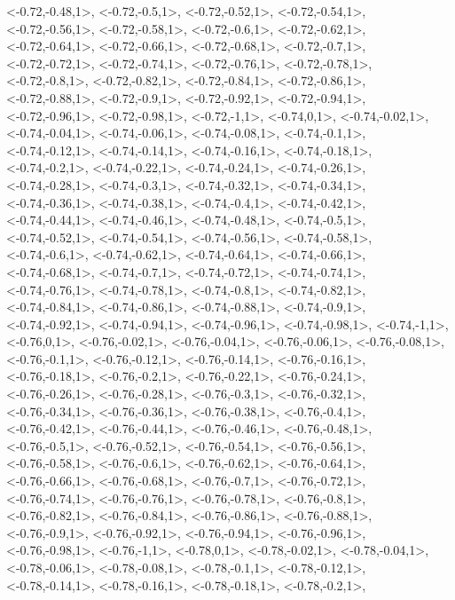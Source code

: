 \documentclass[a4paper,10pt]{article}
\begin{document}
\begin{eulernotebook}
\begin{euleroutput}
  <-0.72,-0.48,1>,
  <-0.72,-0.5,1>,
  <-0.72,-0.52,1>,
  <-0.72,-0.54,1>,
  <-0.72,-0.56,1>,
  <-0.72,-0.58,1>,
  <-0.72,-0.6,1>,
  <-0.72,-0.62,1>,
  <-0.72,-0.64,1>,
  <-0.72,-0.66,1>,
  <-0.72,-0.68,1>,
  <-0.72,-0.7,1>,
  <-0.72,-0.72,1>,
  <-0.72,-0.74,1>,
  <-0.72,-0.76,1>,
  <-0.72,-0.78,1>,
  <-0.72,-0.8,1>,
  <-0.72,-0.82,1>,
  <-0.72,-0.84,1>,
  <-0.72,-0.86,1>,
  <-0.72,-0.88,1>,
  <-0.72,-0.9,1>,
  <-0.72,-0.92,1>,
  <-0.72,-0.94,1>,
  <-0.72,-0.96,1>,
  <-0.72,-0.98,1>,
  <-0.72,-1,1>,
  <-0.74,0,1>,
  <-0.74,-0.02,1>,
  <-0.74,-0.04,1>,
  <-0.74,-0.06,1>,
  <-0.74,-0.08,1>,
  <-0.74,-0.1,1>,
  <-0.74,-0.12,1>,
  <-0.74,-0.14,1>,
  <-0.74,-0.16,1>,
  <-0.74,-0.18,1>,
  <-0.74,-0.2,1>,
  <-0.74,-0.22,1>,
  <-0.74,-0.24,1>,
  <-0.74,-0.26,1>,
  <-0.74,-0.28,1>,
  <-0.74,-0.3,1>,
  <-0.74,-0.32,1>,
  <-0.74,-0.34,1>,
  <-0.74,-0.36,1>,
  <-0.74,-0.38,1>,
  <-0.74,-0.4,1>,
  <-0.74,-0.42,1>,
  <-0.74,-0.44,1>,
  <-0.74,-0.46,1>,
  <-0.74,-0.48,1>,
  <-0.74,-0.5,1>,
  <-0.74,-0.52,1>,
  <-0.74,-0.54,1>,
  <-0.74,-0.56,1>,
  <-0.74,-0.58,1>,
  <-0.74,-0.6,1>,
  <-0.74,-0.62,1>,
  <-0.74,-0.64,1>,
  <-0.74,-0.66,1>,
  <-0.74,-0.68,1>,
  <-0.74,-0.7,1>,
  <-0.74,-0.72,1>,
  <-0.74,-0.74,1>,
  <-0.74,-0.76,1>,
  <-0.74,-0.78,1>,
  <-0.74,-0.8,1>,
  <-0.74,-0.82,1>,
  <-0.74,-0.84,1>,
  <-0.74,-0.86,1>,
  <-0.74,-0.88,1>,
  <-0.74,-0.9,1>,
  <-0.74,-0.92,1>,
  <-0.74,-0.94,1>,
  <-0.74,-0.96,1>,
  <-0.74,-0.98,1>,
  <-0.74,-1,1>,
  <-0.76,0,1>,
  <-0.76,-0.02,1>,
  <-0.76,-0.04,1>,
  <-0.76,-0.06,1>,
  <-0.76,-0.08,1>,
  <-0.76,-0.1,1>,
  <-0.76,-0.12,1>,
  <-0.76,-0.14,1>,
  <-0.76,-0.16,1>,
  <-0.76,-0.18,1>,
  <-0.76,-0.2,1>,
  <-0.76,-0.22,1>,
  <-0.76,-0.24,1>,
  <-0.76,-0.26,1>,
  <-0.76,-0.28,1>,
  <-0.76,-0.3,1>,
  <-0.76,-0.32,1>,
  <-0.76,-0.34,1>,
  <-0.76,-0.36,1>,
  <-0.76,-0.38,1>,
  <-0.76,-0.4,1>,
  <-0.76,-0.42,1>,
  <-0.76,-0.44,1>,
  <-0.76,-0.46,1>,
  <-0.76,-0.48,1>,
  <-0.76,-0.5,1>,
  <-0.76,-0.52,1>,
  <-0.76,-0.54,1>,
  <-0.76,-0.56,1>,
  <-0.76,-0.58,1>,
  <-0.76,-0.6,1>,
  <-0.76,-0.62,1>,
  <-0.76,-0.64,1>,
  <-0.76,-0.66,1>,
  <-0.76,-0.68,1>,
  <-0.76,-0.7,1>,
  <-0.76,-0.72,1>,
  <-0.76,-0.74,1>,
  <-0.76,-0.76,1>,
  <-0.76,-0.78,1>,
  <-0.76,-0.8,1>,
  <-0.76,-0.82,1>,
  <-0.76,-0.84,1>,
  <-0.76,-0.86,1>,
  <-0.76,-0.88,1>,
  <-0.76,-0.9,1>,
  <-0.76,-0.92,1>,
  <-0.76,-0.94,1>,
  <-0.76,-0.96,1>,
  <-0.76,-0.98,1>,
  <-0.76,-1,1>,
  <-0.78,0,1>,
  <-0.78,-0.02,1>,
  <-0.78,-0.04,1>,
  <-0.78,-0.06,1>,
  <-0.78,-0.08,1>,
  <-0.78,-0.1,1>,
  <-0.78,-0.12,1>,
  <-0.78,-0.14,1>,
  <-0.78,-0.16,1>,
  <-0.78,-0.18,1>,
  <-0.78,-0.2,1>,

\end{euleroutput}
\end{eulernotebook}
\end{document}
